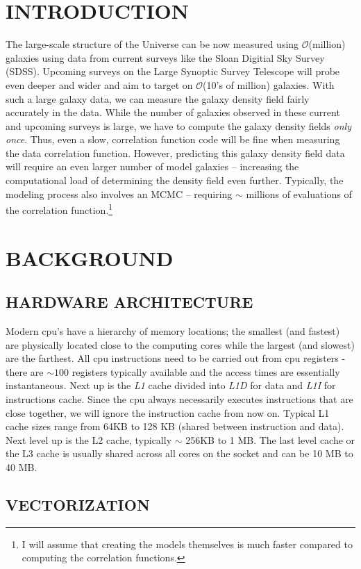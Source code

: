 \documentclass[preprint, 12pt, authoryear]{elsarticle}
\begin{document}
\section{INTRODUCTION}
The large-scale structure of the Universe can be now measured using $\mathcal{O}$(million) galaxies 
using data from current surveys like the Sloan Digitial Sky Survey (SDSS). Upcoming
surveys on the Large Synoptic Survey Telescope will probe even 
deeper and wider and aim to target on $\mathcal{O}$(10's of million) galaxies. With such a large galaxy data, 
we can measure the galaxy density field fairly accurately in the data. While the number of galaxies observed 
in these current and upcoming surveys is large, we have to compute the galaxy density fields {\em only once}. Thus, 
even a slow, correlation function code will be fine when measuring the data correlation function. 
However, predicting this galaxy  density field data will require an even larger number of model galaxies -- increasing the computational 
load of determining the density field even further. Typically, the modeling process also involves an MCMC -- 
requiring $\sim$ millions of evaluations of the correlation function.\footnote{I will assume that creating the models themselves 
is much faster compared to computing the correlation functions.} 

\section{BACKGROUND}
\subsection{HARDWARE ARCHITECTURE}
Modern cpu's have a hierarchy of memory locations; the smallest (and fastest) are physically located close to the computing cores 
while the largest (and slowest) are the farthest. All cpu instructions need to be carried out from cpu registers - there are $\sim 100$ 
registers typically available and the access times are essentially
instantaneous. Next up is the {\em L1} cache 
divided into {\em L1D} for data and {\em L1I} for instructions cache. Since 
the cpu always necessarily executes instructions that are close together, we will ignore the instruction cache from now on. Typical L1 cache 
sizes range from 64KB to 128 KB (shared between instruction and data). 
Next level up is the L2 cache, typically $\sim$ 256KB to 1 MB. The last level cache or the L3 cache is usually shared across all 
cores on the socket and can be 10 MB to 40 MB. 
\subsection{VECTORIZATION}
\end{document}
